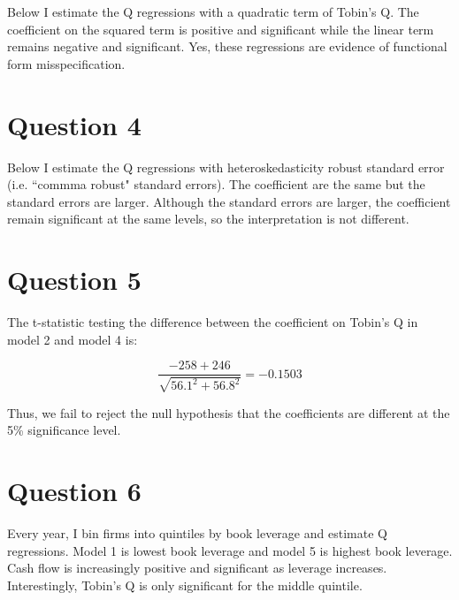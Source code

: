 \documentclass{article}
\begin{document}
Below I estimate the Q regressions with a quadratic term of Tobin's Q.  The coefficient on the squared term is positive and significant while the linear term remains negative and significant.  Yes, these regressions are evidence of functional form misspecification.

\bigskip

\begin{center}

\end{center}

\pagebreak


\section{Question 4}

Below I estimate the Q regressions with heteroskedasticity robust standard error (i.e. ``commma robust" standard errors).  The coefficient are the same but the standard errors are larger. Although the standard errors are larger, the coefficient remain significant at the same levels, so the interpretation is not different.

\bigskip

\begin{center}

\end{center}

\bigskip

\section{Question 5}

The t-statistic testing the difference between the coefficient on Tobin's Q in model 2 and model 4 is:

$$
\frac{-258 + 246}{\sqrt{56.1^2 + 56.8^2}} = -0.1503
$$

Thus, we fail to reject the null hypothesis that the coefficients are different at the 5\% significance level.

\section{Question 6}

Every year, I bin firms into quintiles by book leverage and estimate Q regressions. Model 1 is lowest book leverage and model 5 is highest book leverage.  Cash flow is increasingly positive and significant as leverage increases.  Interestingly, Tobin's Q is only significant for the middle quintile.
\end{document}

